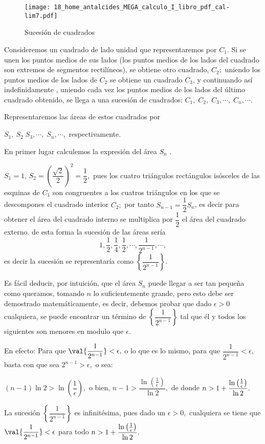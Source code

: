 \begin{ejemplo}\label{ej:lim33}

\begin{wrapfigure}{r}{0.4\linewidth} \centering

\texttt{[image: 18\_home\_antalcides\_MEGA\_calculo\_I\_libro\_pdf\_cal-lim7.pdf]}
\caption{Sucesi\'on de cuadrados}
\label{fig:cal_lim7} 

\end{wrapfigure}

Consideremos un cuadrado de lado unidad que representaremos por $C_{1}.$
Si se unen los puntos medios de sus lados (los puntos medios de los
lados del cuadrado son extremos de segmentos rectilíneos), se obtiene
otro cuadrado, $C_{2};$ uniendo los puntos medios de los lados de
$C_{2}$ se obtiene un cuadrado $C_{3}$, y continuando así indefinidamente
, uniendo cada vez los puntos medios de los lados del último cuadrado
obtenido, se llega a una sucesión de cuadrados: $C_{1},\;C_{2},\;C_{3},\cdots,\;C_{n},\cdots$.

Representaremos las áreas de estos cuadrados por

$S_{1},\:S_{2}\;S_{3},\cdots,\;S_{n},\cdots,$ respectivamente.

En primer lugar calculemos la expresión del área $S_{n}$ .

$S_{1}=1$, $S_{2}=\left(\dfrac{\sqrt{2}}{2}\right)^{2}=\dfrac{1}{2},$
pues los cuatro triángulos rectángulos isósceles de las esquinas de
$C_{1}$ son congruentes a los cuatros triángulos en los que se descompones
el cuadrado interior $C_{2};$ por tanto $S_{n-1}=\dfrac{1}{2}S_{n}$,
es decir para obtener el área del cuadrado interno se multiplica por
$\dfrac{1}{2}$ el área del cuadrado externo. de esta forma la sucesión
de las áreas sería
\[
1,\dfrac{1}{2},\dfrac{1}{4},\dfrac{1}{2},\cdots,\dfrac{1}{2^{n-1}},\cdots,
\]
es decir la sucesión se representaría como $\left\{ \dfrac{1}{2^{n-1}}\right\} .$ 

Es fácil deducir, por intuición, que el área $S_{n}$ puede llegar
a ser tan pequeña como queramos, tomando $n$ lo suficientemente grande,
pero esto debe ser demostrado matemáticamente, es decir, debemos probar
que dado $\epsilon>0$ cualquiera, se puede encontrar un término de
$\left\{ \dfrac{1}{2^{n-1}}\right\} $ tal que él y todos los siguientes
son menores en modulo que $\epsilon.$

En efecto: Para que $\val{\dfrac{1}{2^{n-1}}}<\epsilon,$ o lo que
es lo mismo, para que $\dfrac{1}{2^{n-1}}<\epsilon,$ basta con que
sea $2^{n-1}>\epsilon,$ o sea: 

$\left(n-1\right)\ln2>\ln\left(\dfrac{1}{\epsilon}\right),$ o bien,
$n-1>\dfrac{\ln\left(\frac{1}{\epsilon}\right)}{\ln2},$ de donde
$n>1+\dfrac{\text{\ensuremath{\ln\left(\frac{1}{\epsilon}\right)}}}{\ln2}.$

\conclu La sucesión $\left\{ \dfrac{1}{2^{n-1}}\right\} $ es infinitésima,
pues dado un $\epsilon>0,$ cualquiera se tiene que $\val{\dfrac{1}{2^{n-1}}}<\epsilon$
para todo $n>1+\dfrac{\text{\ensuremath{\ln\left(\frac{1}{\epsilon}\right)}}}{\ln2}.$

\end{ejemplo}

